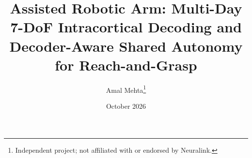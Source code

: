 \documentclass[10pt,twocolumn]{article}
\title{\textbf{Assisted Robotic Arm: Multi-Day 7-DoF Intracortical Decoding and Decoder-Aware Shared Autonomy for Reach-and-Grasp}}
\author{Amal Mehta\thanks{Independent project; not affiliated with or endorsed by Neuralink.}}
\date{October 2026}
\begin{document}
\maketitle

\begin{abstract}

\end{abstract}



{\small


}
\end{document}
